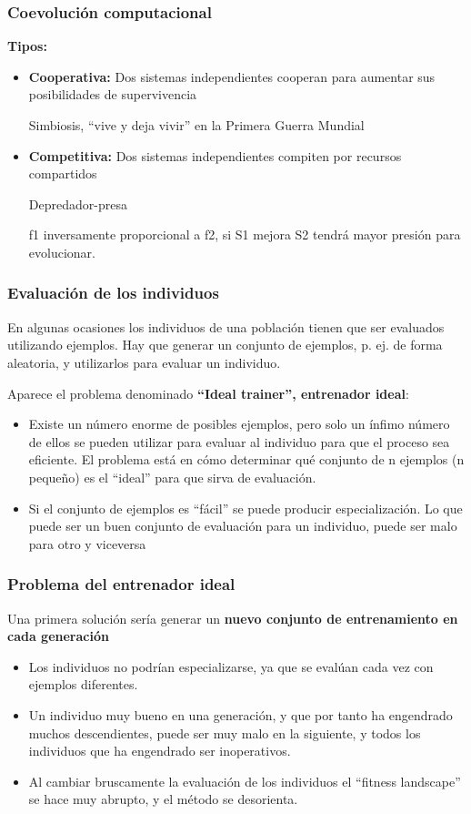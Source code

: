 \documentclass[12pt, twoside, openright]{report} %
\begin{document}
\subsubsection{Coevolución computacional}
\textbf{Tipos:}
\begin{itemize}
	\item \textbf{Cooperativa:} Dos sistemas independientes cooperan para aumentar sus posibilidades de supervivencia
	
	Simbiosis, “vive y deja vivir” en la Primera Guerra Mundial
	\item \textbf{Competitiva:} Dos sistemas independientes compiten por recursos compartidos
	
	Depredador-presa
	
	f1 inversamente proporcional a f2, si S1 mejora S2 tendrá mayor presión para evolucionar.
\end{itemize}

\subsubsection{Evaluación de los individuos}
En algunas ocasiones los individuos de una población tienen que ser evaluados utilizando ejemplos. Hay que generar un conjunto de ejemplos, p. ej. de forma aleatoria, y utilizarlos para evaluar un individuo.

Aparece el problema denominado \textbf{“Ideal trainer”, entrenador ideal}:
\begin{itemize}
	\item Existe un número enorme de posibles ejemplos, pero solo un ínfimo número de ellos se pueden utilizar para evaluar al individuo para que el proceso sea eficiente. El problema está en cómo determinar qué conjunto de n ejemplos (n pequeño) es el “ideal” para que sirva de evaluación. 
	\item Si el conjunto de ejemplos es “fácil” se puede producir especialización. Lo que puede ser un buen conjunto de evaluación para un individuo, puede ser malo para otro y viceversa
\end{itemize}

\subsubsection{Problema del entrenador ideal}
Una primera solución sería generar un \textbf{nuevo conjunto de entrenamiento en cada generación}
\begin{itemize}
	\item Los individuos no podrían especializarse, ya que se evalúan cada vez con ejemplos diferentes.
	\item Un individuo muy bueno en una generación, y que por tanto ha engendrado muchos descendientes, puede ser muy malo en la siguiente, y todos los individuos que ha engendrado ser inoperativos.
	\item Al cambiar bruscamente la evaluación de los individuos el “fitness landscape” se hace muy abrupto, y el método se desorienta.
\end{itemize}
\end{document}
